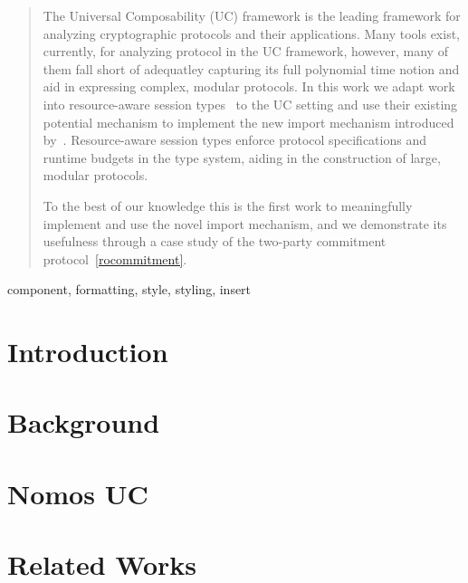 \documentclass[conference]{IEEEtran}
\begin{document}
\begin{abstract}
The Universal Composability (UC) framework is the leading framework for analyzing cryptographic protocols and their applications.
Many tools exist, currently, for analyzing protocol in the UC framework, however, many of them fall short of adequatley capturing its full polynomial time notion and aid in expressing complex, modular protocols.
In this work we adapt work into resource-aware session types~\cite{dasnomos} to the UC setting and use their existing potential mechanism to implement the new import mechanism introduced by~\cite{uc}.
Resource-aware session types enforce protocol specifications and runtime budgets in the type system, aiding in the construction of large, modular protocols.

To the best of our knowledge this is the first work to meaningfully implement and use the novel import mechanism, and we demonstrate its usefulness through a case study of the two-party commitment protocol~\ref{rocommitment}.
\end{abstract}

\begin{IEEEkeywords}
component, formatting, style, styling, insert
\end{IEEEkeywords}

\section{Introduction}


\section{Background} \label{sec:background}


\section{Nomos UC} \label{sec:nomosuc}


\section{Related Works}


%
\end{document}
